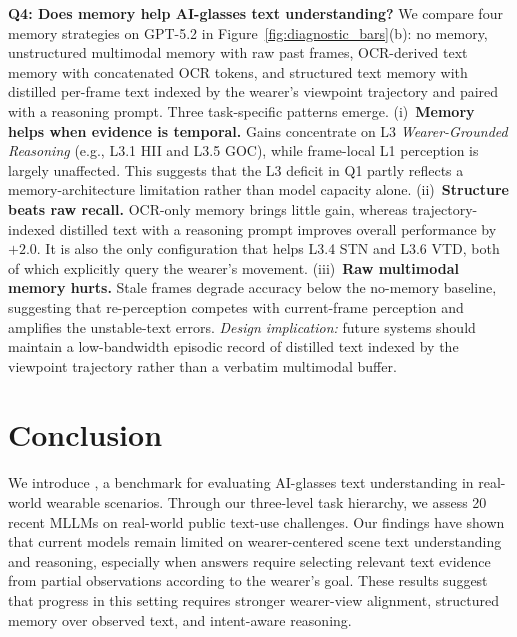 \documentclass[11pt]{article}
\theoremstyle{plain}
\theoremstyle{definition}
\theoremstyle{remark}
\begin{document}
\noindent\textbf{Q4: Does memory help AI-glasses text understanding?}
We compare four memory strategies on GPT-5.2 in Figure~\ref{fig:diagnostic_bars}(b): no memory, unstructured multimodal memory with raw past frames, OCR-derived text memory with concatenated OCR tokens, and structured text memory with distilled per-frame text indexed by the wearer's viewpoint trajectory and paired with a reasoning prompt. Three task-specific patterns emerge.
(i)~\textbf{Memory helps when evidence is temporal.} Gains concentrate on L3 \textit{Wearer-Grounded Reasoning} (e.g., L3.1 HII and L3.5 GOC), while frame-local L1 perception is largely unaffected. This suggests that the L3 deficit in Q1 partly reflects a memory-architecture limitation rather than model capacity alone.
(ii)~\textbf{Structure beats raw recall.} OCR-only memory brings little gain, whereas trajectory-indexed distilled text with a reasoning prompt improves overall performance by $+2.0$. It is also the only configuration that helps L3.4 STN and L3.6 VTD, both of which explicitly query the wearer's movement.
(iii)~\textbf{Raw multimodal memory hurts.} Stale frames degrade accuracy below the no-memory baseline, suggesting that re-perception competes with current-frame perception and amplifies the unstable-text errors.
\emph{Design implication:} future systems should maintain a low-bandwidth episodic record of distilled text indexed by the viewpoint trajectory rather than a verbatim multimodal buffer.











%
\section{Conclusion}

We introduce \dataset, a benchmark for evaluating AI-glasses text understanding in real-world wearable scenarios. Through our three-level task hierarchy, we assess {20} recent MLLMs on real-world public text-use challenges. Our findings have shown that current models remain limited on wearer-centered scene text understanding and reasoning, especially when answers require selecting relevant text evidence from partial observations according to the wearer's goal. These results suggest that progress in this setting requires stronger wearer-view alignment, structured memory over observed text, and intent-aware reasoning.
\end{document}
